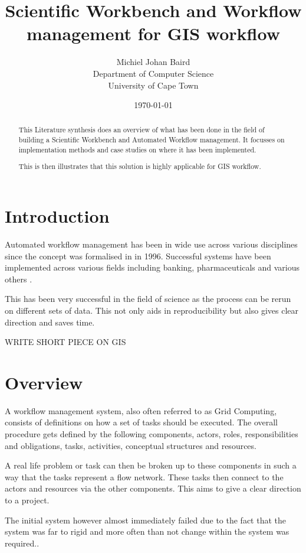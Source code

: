 \documentclass[11pt,twocolumn]{article}
\title{Scientific Workbench and Workflow management for GIS workflow}
\author{
    Michiel Johan Baird \\
        Department of Computer Science \\
        University of Cape Town
}
\date{\today}
\begin{document}
\maketitle
\begin{abstract}
    This Literature synthesis does an overview of what has been done
    in the field of building a Scientific Workbench and Automated
    Workflow management. It focusses on implementation methods and
    case studies on where it has been implemented.

    This is then illustrates that this solution is highly applicable
    for GIS workflow.
\end{abstract}
\section{Introduction}
    Automated workflow management has been in wide use across
    various disciplines since the concept was formalised in in
    1996\cite{springerlink:10.1007/BF00136712}. Successful systems
    have been implemented across various fields including banking,
    pharmaceuticals and various others
    \cite{Brahe:2007:SWW:1316624.1316661,5407993}.

    This has been very successful in the field of science as
    the process can be rerun on different sets of data.\cite{4721191}
    This not only aids in reproducibility but also gives
    clear direction and saves time.

    WRITE SHORT PIECE ON GIS

\section{Overview}
    A workflow management system, also often referred to as
    Grid Computing, consists of definitions on how a set of
    tasks should be executed\cite{springerlink:10.1007/BF00136712,vanderAalst2002125}.
    The overall procedure gets defined by the following
    components, actors, roles, responsibilities and
    obligations, tasks, activities, conceptual structures
    and resources.

    A real life problem or task can then be broken up to these
    components in such a way that the tasks represent a flow
    network. These tasks then connect to the actors and resources
    via the other components\cite[p.~4]{Taylor:2006:WES:1196459}.
    This aims to give a clear direction to a project.

    The initial system however almost immediately failed
    due to the fact that the system was far to rigid and
    more often than not change within the system was
    required.\cite{Suchman:1983:OPP:357442.357445}.
\end{document}
